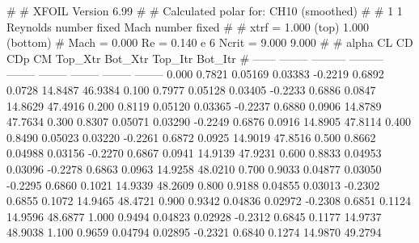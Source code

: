 #  
#       XFOIL         Version 6.99
#  
# Calculated polar for: CH10 (smoothed)                                 
#  
# 1 1 Reynolds number fixed          Mach number fixed         
#  
# xtrf =   1.000 (top)        1.000 (bottom)  
# Mach =   0.000     Re =     0.140 e 6     Ncrit =   9.000  9.000
#  
#   alpha    CL        CD       CDp       CM     Top_Xtr  Bot_Xtr  Top_Itr  Bot_Itr
#  ------ -------- --------- --------- -------- -------- -------- -------- --------
   0.000   0.7821   0.05169   0.03383  -0.2219   0.6892   0.0728  14.8487  46.9384
   0.100   0.7977   0.05128   0.03405  -0.2233   0.6886   0.0847  14.8629  47.4916
   0.200   0.8119   0.05120   0.03365  -0.2237   0.6880   0.0906  14.8789  47.7634
   0.300   0.8307   0.05071   0.03290  -0.2249   0.6876   0.0916  14.8905  47.8114
   0.400   0.8490   0.05023   0.03220  -0.2261   0.6872   0.0925  14.9019  47.8516
   0.500   0.8662   0.04988   0.03156  -0.2270   0.6867   0.0941  14.9139  47.9231
   0.600   0.8833   0.04953   0.03096  -0.2278   0.6863   0.0963  14.9258  48.0210
   0.700   0.9033   0.04877   0.03050  -0.2295   0.6860   0.1021  14.9339  48.2609
   0.800   0.9188   0.04855   0.03013  -0.2302   0.6855   0.1072  14.9465  48.4721
   0.900   0.9342   0.04836   0.02972  -0.2308   0.6851   0.1124  14.9596  48.6877
   1.000   0.9494   0.04823   0.02928  -0.2312   0.6845   0.1177  14.9737  48.9038
   1.100   0.9659   0.04794   0.02895  -0.2321   0.6840   0.1274  14.9870  49.2794
